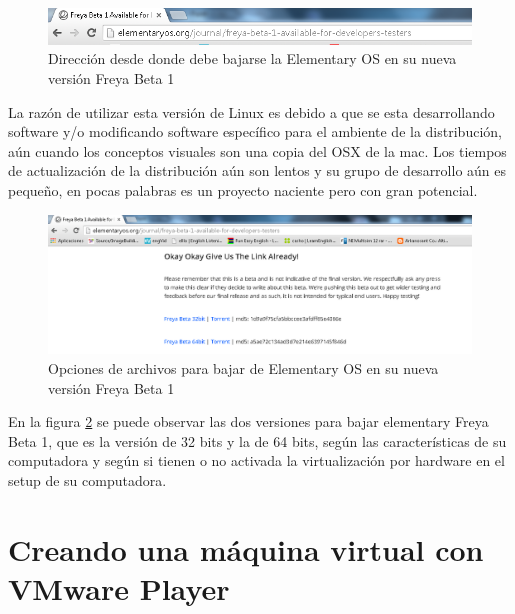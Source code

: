\documentclass[12pt, twoside]{report}
\begin{document}
\begin{figure}
	\centering
	\includegraphics[width=1.0\linewidth]{elementaryOS.png}
	\caption{Dirección desde donde debe bajarse la Elementary OS en su nueva versión Freya Beta 1}
	\label{fig1007}
\end{figure}

La razón de utilizar esta versión de Linux es debido a que se esta desarrollando software y/o modificando software específico para el ambiente de la distribución, aún cuando los conceptos visuales son una copia del OSX de la mac. Los tiempos de actualización de la distribución aún son lentos y su grupo de desarrollo aún es pequeño, en pocas palabras es un proyecto naciente pero con gran potencial. 

\begin{figure}
	\centering
	\includegraphics[width=1.0\linewidth]{ArchivoElementaryOS.png}
	\caption{Opciones de archivos para bajar de Elementary OS en su nueva versión Freya Beta 1}
	\label{fig1008}
\end{figure}

En la figura \ref{fig1008} se puede observar las dos versiones para bajar elementary Freya Beta 1, que es la versión de 32 bits y la de 64 bits, según las características de su computadora y según si tienen o no activada la virtualización por hardware en el setup de su computadora.

\section{Creando una máquina virtual con VMware Player}
	
\end{document}
